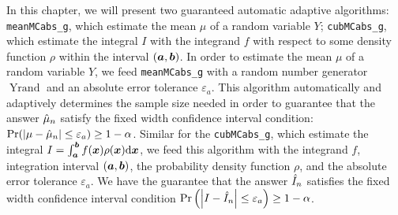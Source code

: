 \documentclass{iitthesis}
\DeclareMathOperator{\Yrand}{Yrand}
\theoremstyle{definition}
\begin{document}
In this chapter, we will present two guaranteed automatic adaptive algorithms: {\tt meanMCabs\_g}, which estimate the mean $\mu$ of a random variable $Y$; {\tt cubMCabs\_g}, which estimate the integral $I$ with the integrand $f$ with respect to some density function $\rho$ within the interval $(\boldsymbol{a},\boldsymbol{b})$. In order to estimate the mean $\mu$ of a random variable $Y$, we feed {\tt meanMCabs\_g} with a random number generator $\Yrand$ and an absolute error tolerance $\varepsilon_a$. This algorithm automatically and adaptively determines the sample size needed in order to guarantee that the answer $\hat{\mu}_n$ satisfy the fixed width confidence interval condition: $\Pr (\left \lvert \mu-\hat{\mu}_n \right \rvert \leq \varepsilon_a) \geq 1-\alpha$. Similar for the {\tt cubMCabs\_g}, which estimate the integral $I=\int_{\boldsymbol{a}}^{\boldsymbol{b}} f(\boldsymbol{x})\rho(\boldsymbol{x}){\rm d}\boldsymbol{x}$, we feed this algorithm with the integrand $f$, integration interval $(\boldsymbol{a},\boldsymbol{b})$, the probability density function $\rho$, and the absolute error tolerance $\varepsilon_a$. We have the guarantee that the answer $\hat{I}_n$ satisfies the fixed width confidence interval condition $\Pr \left(\left \lvert I-\hat{I}_n \right \rvert \leq \varepsilon_a\right) \geq 1-\alpha$.

 \label{sec:meanMCabsg}
\end{document}
